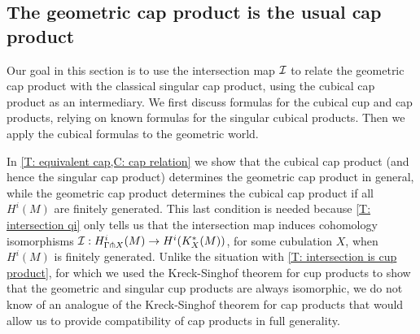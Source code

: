 \begin{comment}
	The following is now standard homological algebra:
	\begin{corollary}
		The external cochain cross product induces an \textbf{(external) cohomology cross product} $H^i_\Gamma(M) \otimes H^j_\Gamma(N) \to H^{i+j}_\Gamma(M \times N)$.
	\end{corollary}

	\begin{theorem}
		Let $M$ and $N$ be manifolds.
		Then the geometric cohomology cross product $H^i_\Gamma(M) \otimes H^j_\Gamma(N) \to H^{i+j}_\Gamma(M \times N)$ is isomorphic to the singular cohomology cross product $H^i(M) \otimes H^j(N) \to H^{i+j}(M \times N)$.
	\end{theorem}

	\begin{proof}
		NEED MORE GENERAL INTERSECTION MAP THEOREM OR TO RESTRICT TO COMPACT MANIFOLDS

	\end{proof}
\end{comment}

\subsection{The geometric cap product is the usual cap product}

Our goal in this section is to use the intersection map $\mathcal{I}$ to relate the geometric cap product with the classical singular cap product, using the cubical cap product as an intermediary.
We first discuss formulas for the cubical cup and cap products, relying on known formulas for the singular cubical products.
Then we apply the cubical formulas to the geometric world.

In \cref{T: equivalent cap,C: cap relation} we show that the cubical cap product (and hence the singular cap product) determines the geometric cap product in general, while the geometric cap product determines the cubical cap product if all $H^i(M)$ are finitely generated.
This last condition is needed because \cref{T: intersection qi} only tells us that the intersection map induces cohomology isomorphisms $\mathcal{I}: H^i_{\Gamma\pitchfork X}(M) \to H^i(K_X^*(M))$, for some cubulation $X$, when $H^i(M)$ is finitely generated.
Unlike the situation with \cref{T: intersection is cup product}, for which we used the Kreck-Singhof theorem for cup products to show that the geometric and singular cup products are always isomorphic, we do not know of an analogue of the Kreck-Singhof theorem for cap products that would allow us to provide compatibility of cap products in full generality.

